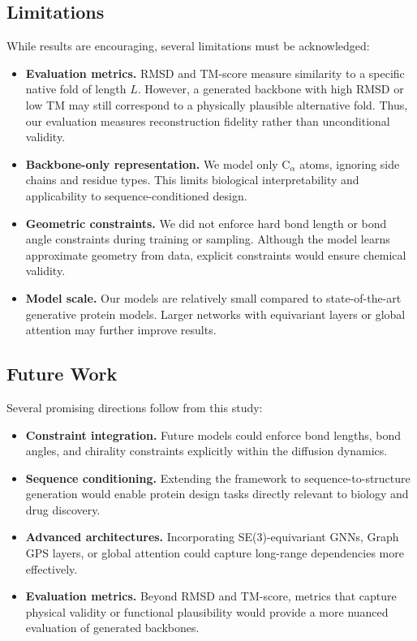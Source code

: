 \documentclass[a4paper,12pt]{article}
\begin{document}
\subsection{Limitations}\label{subsec:limitations}
While results are encouraging, several limitations must be acknowledged:
\begin{itemize}
    \item \textbf{Evaluation metrics.} RMSD and TM-score measure similarity to a specific native fold of length \(L\). However, a generated backbone with high RMSD or low TM may still correspond to a physically plausible alternative fold. Thus, our evaluation measures reconstruction fidelity rather than unconditional validity.
    \item \textbf{Backbone-only representation.} We model only C\(_\alpha\) atoms, ignoring side chains and residue types. This limits biological interpretability and applicability to sequence-conditioned design.
    \item \textbf{Geometric constraints.} We did not enforce hard bond length or bond angle constraints during training or sampling. Although the model learns approximate geometry from data, explicit constraints would ensure chemical validity.
    \item \textbf{Model scale.} Our models are relatively small compared to state-of-the-art generative protein models. Larger networks with equivariant layers or global attention may further improve results.
\end{itemize}

\subsection{Future Work}\label{subsec:future-work}
Several promising directions follow from this study:
\begin{itemize}
    \item \textbf{Constraint integration.} Future models could enforce bond lengths, bond angles, and chirality constraints explicitly within the diffusion dynamics.
    \item \textbf{Sequence conditioning.} Extending the framework to sequence-to-structure generation would enable protein design tasks directly relevant to biology and drug discovery.
    \item \textbf{Advanced architectures.} Incorporating SE(3)-equivariant GNNs, Graph GPS layers, or global attention could capture long-range dependencies more effectively.
    \item \textbf{Evaluation metrics.} Beyond RMSD and TM-score, metrics that capture physical validity or functional plausibility would provide a more nuanced evaluation of generated backbones.
\end{itemize}
\end{document}
